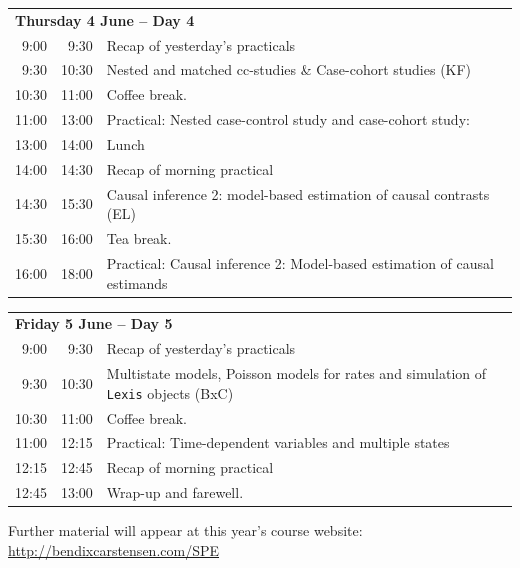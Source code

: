 \documentclass[a4paper, 12pt]{article}
\begin{document}
\noindent
\begin{tabular}{r@{ -- }rp{13cm}}
\multicolumn{3}{l}{\bf Thursday 4 June -- Day 4} \\
 9:00 &  9:30 & Recap of yesterday's practicals \\
 9:30 & 10:30 & Nested and matched cc-studies \& Case-cohort studies (KF)\\
10:30 & 11:00 & Coffee break. \\
11:00 & 13:00 & Practical: Nested case-control study and case-cohort study: \\ %
13:00 & 14:00 & Lunch \\
14:00 & 14:30 & Recap of morning practical \\
14:30 & 15:30 & Causal inference 2: model-based estimation of causal
                contrasts (EL)\\ %
15:30 & 16:00 & Tea break. \\
16:00 & 18:00 & Practical: Causal inference 2: Model-based estimation of causal estimands \\ %

\end{tabular}

\noindent
\begin{tabular}{r@{ -- }rp{13cm}}
\multicolumn{3}{l}{\bf Friday 5 June -- Day 5} \\
 9:00 &  9:30 & Recap of yesterday's practicals \\
 9:30 & 10:30 & Multistate models, Poisson models for rates and
                simulation of \texttt{Lexis} objects (BxC)\\
10:30 & 11:00 & Coffee break. \\
11:00 & 12:15 & Practical: Time-dependent variables and multiple states\\ %
12:15 & 12:45 & Recap of morning practical \\
12:45 & 13:00 & Wrap-up and farewell.\\
\end{tabular}
\vfill
\noindent
Further material will appear at this year's course website:\\
\url{http://bendixcarstensen.com/SPE}
\end{document}
